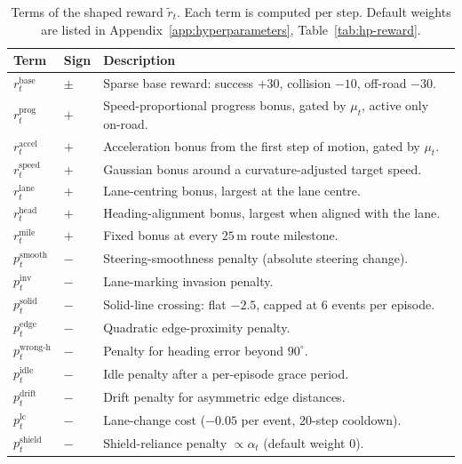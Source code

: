 \begin{table}[H]
  \centering
  \caption{Terms of the shaped reward \(\tilde{r}_t\). Each term is computed per step. Default
           weights are listed in Appendix~\ref{app:hyperparameters}, Table~\ref{tab:hp-reward}.}
  \label{tab:reward-terms}
  \small
  \begin{tabular}{@{}llp{8.0cm}@{}}
    \toprule
    \textbf{Term} & \textbf{Sign} & \textbf{Description} \\
    \midrule
    \(r^{\mathrm{base}}_t\)        & \(\pm\) & Sparse base reward: success \(+30\), collision \(-10\), off-road \(-30\). \\
    \(r^{\mathrm{prog}}_t\)        & \(+\)   & Speed-proportional progress bonus, gated by \(\mu_t\), active only on-road. \\
    \(r^{\mathrm{accel}}_t\)       & \(+\)   & Acceleration bonus from the first step of motion, gated by \(\mu_t\). \\
    \(r^{\mathrm{speed}}_t\)       & \(+\)   & Gaussian bonus around a curvature-adjusted target speed. \\
    \(r^{\mathrm{lane}}_t\)        & \(+\)   & Lane-centring bonus, largest at the lane centre. \\
    \(r^{\mathrm{head}}_t\)        & \(+\)   & Heading-alignment bonus, largest when aligned with the lane. \\
    \(r^{\mathrm{mile}}_t\)        & \(+\)   & Fixed bonus at every \(25\,\mathrm{m}\) route milestone. \\
    \(p^{\mathrm{smooth}}_t\)      & \(-\)   & Steering-smoothness penalty (absolute steering change). \\
    \(p^{\mathrm{inv}}_t\)         & \(-\)   & Lane-marking invasion penalty. \\
    \(p^{\mathrm{solid}}_t\)       & \(-\)   & Solid-line crossing: flat \(-2.5\), capped at \(6\) events per episode. \\
    \(p^{\mathrm{edge}}_t\)        & \(-\)   & Quadratic edge-proximity penalty. \\
    \(p^{\mathrm{wrong\text{-}h}}_t\) & \(-\) & Penalty for heading error beyond \(90^\circ\). \\
    \(p^{\mathrm{idle}}_t\)        & \(-\)   & Idle penalty after a per-episode grace period. \\
    \(p^{\mathrm{drift}}_t\)       & \(-\)   & Drift penalty for asymmetric edge distances. \\
    \(p^{\mathrm{lc}}_t\)          & \(-\)   & Lane-change cost (\(-0.05\) per event, 20-step cooldown). \\
    \(p^{\mathrm{shield}}_t\)      & \(-\)   & Shield-reliance penalty \(\propto \alpha_t\) (default weight \(0\)). \\
    \bottomrule
  \end{tabular}
\end{table}

